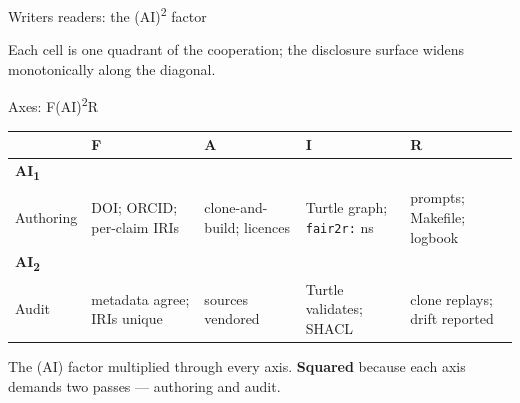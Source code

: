 \documentclass[aspectratio=169,11pt]{beamer}
\begin{document}
\begin{frame}{Writers \texttimes{} readers: the (AI)\textsuperscript{2} factor}
  \begin{center}
    \resizebox{0.78\linewidth}{!}{}
  \end{center}
  \vspace{-0.3em}
  \footnotesize Each cell is one quadrant of the cooperation; the
  disclosure surface widens monotonically along the diagonal.
\end{frame}


\begin{frame}{Axes: F(AI)\textsuperscript{2}R}
  \footnotesize
  \begin{tabular}{lp{3.0cm}p{3.0cm}p{3.0cm}p{3.0cm}}
    \toprule
              & \textbf{F} & \textbf{A} & \textbf{I} & \textbf{R} \\
    \midrule
    \textbf{AI\textsubscript{1}}\\Authoring &
      DOI; ORCID; per-claim IRIs &
      clone-and-build; licences &
      Turtle graph; \texttt{fair2r:} ns &
      prompts; Makefile; logbook \\
    \addlinespace
    \textbf{AI\textsubscript{2}}\\Audit &
      metadata agree; IRIs unique &
      sources vendored &
      Turtle validates; SHACL &
      clone replays; drift reported \\
    \bottomrule
  \end{tabular}

  \vspace{0.6em}
  \normalsize
  The (AI) factor multiplied through every axis. \textbf{Squared} because each axis demands two passes --- authoring and audit.
\end{frame}
\end{document}
